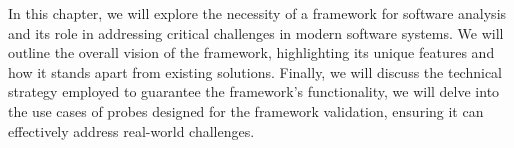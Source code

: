 In this chapter, we will explore the necessity of a framework for software analysis and its role in addressing critical challenges in modern software systems. We will outline the overall vision of the framework, highlighting its unique features and how it stands apart from existing solutions. Finally, we will discuss the technical strategy employed to guarantee the framework's functionality, we will delve into the use cases of probes designed for the framework validation, ensuring it can effectively address real-world challenges.

